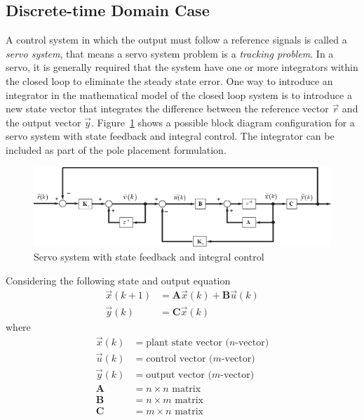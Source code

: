 \documentclass[11pt,a4paper,oneside]{book}
\numberwithin{equation}{section}
\theoremstyle{it}
\theoremstyle{definition}
\begin{document}
\subsection{Discrete-time Domain Case}
A control system in which the output must follow a reference signals is called a 
\textit{servo system}, that means a servo system problem is a \textit{tracking problem}. In a servo, it is generally required that the system have one or more integrators within the closed loop to eliminate the 
steady state error. One way to introduce an integrator in the mathematical model of the closed loop system is to introduce a new state vector that integrates the difference between the reference vector $\vec{r}$ and the output vector $\vec{y}$. Figure~\ref{figure_servo_1} shows a possible block diagram 
configuration for a servo system with state feedback and integral control. The 
integrator can be included as part of the pole placement formulation.
\begin{figure}[H]
	\centering
	\includegraphics[width = 400pt, 
	keepaspectratio,angle=0]{figures/servo_1.eps}
	\captionsetup{width=0.5\textwidth, font=small}
	\caption{Servo system with state feedback and integral control}
	\label{figure_servo_1}
\end{figure}
Considering the following state and output equation
\begin{equation}\label{eq_servo_1}
	\begin{aligned}
		\vec{x}(k+1) &= \mathbf{A}\vec{x}(k)+\mathbf{B}\vec{u}(k) \\[6pt]
		\vec{y}(k) &= \mathbf{C}\vec{x}(k)
	\end{aligned}
\end{equation}
where
\begin{equation*}
	\begin{aligned}
		\vec{x}(k) &= \text{plant state vector ($n$-vector)}\\[6pt]
		\vec{u}(k) &= \text{control vector ($m$-vector)}\\[6pt]
		\vec{y}(k) &= \text{output vector ($m$-vector)}\\[6pt]
		\mathbf{A} &= \text{$n \times n$ matrix}\\[6pt]
		\mathbf{B} &= \text{$n \times m$ matrix}\\[6pt]
		\mathbf{C} &= \text{$m \times n$ matrix}
	\end{aligned}
\end{equation*}
\end{document}
